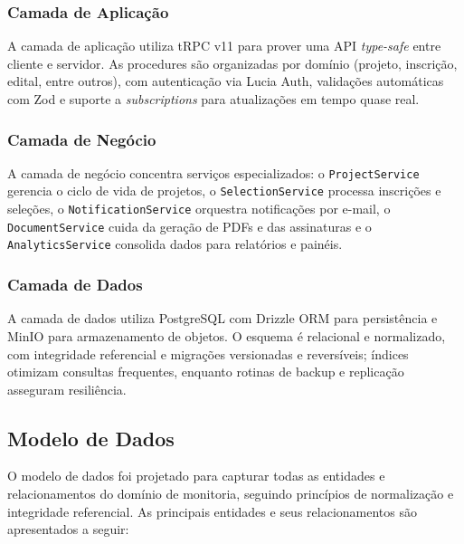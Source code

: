 \documentclass[portuguese]{sbc2025}%
\begin{document}
\subsubsection{Camada de Aplicação}

A camada de aplicação utiliza tRPC v11 para prover uma API \textit{type-safe} entre cliente e servidor. As procedures são organizadas por domínio (projeto, inscrição, edital, entre outros), com autenticação via Lucia Auth, validações automáticas com Zod e suporte a \textit{subscriptions} para atualizações em tempo quase real.

\subsubsection{Camada de Negócio}

A camada de negócio concentra serviços especializados: o \texttt{ProjectService} gerencia o ciclo de vida de projetos, o \texttt{SelectionService} processa inscrições e seleções, o \texttt{NotificationService} orquestra notificações por e-mail, o \texttt{DocumentService} cuida da geração de PDFs e das assinaturas e o \texttt{AnalyticsService} consolida dados para relatórios e painéis.

\subsubsection{Camada de Dados}

A camada de dados utiliza PostgreSQL com Drizzle ORM para persistência e MinIO para armazenamento de objetos. O esquema é relacional e normalizado, com integridade referencial e migrações versionadas e reversíveis; índices otimizam consultas frequentes, enquanto rotinas de backup e replicação asseguram resiliência.

\subsection{Modelo de Dados}

O modelo de dados foi projetado para capturar todas as entidades e relacionamentos do domínio de monitoria, seguindo princípios de normalização e integridade referencial. As principais entidades e seus relacionamentos são apresentados a seguir:
\end{document}
